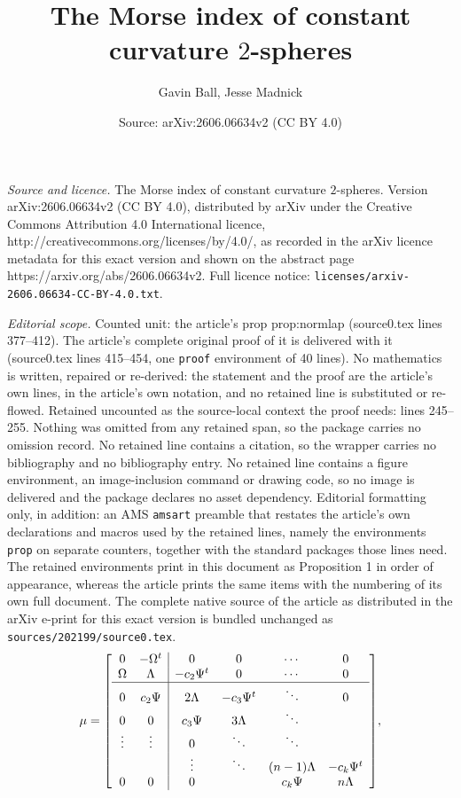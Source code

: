 \documentclass[10pt,a4paper]{amsart}
\title{The Morse index of constant curvature $2$-spheres}
\author{Gavin Ball, Jesse Madnick}
\date{Source: arXiv:2606.06634v2 (CC BY 4.0)}
\begin{document}
\maketitle

\noindent\emph{Source and licence.} The Morse index of constant curvature $2$-spheres. Version arXiv:2606.06634v2 (CC BY 4.0), distributed by arXiv under the Creative Commons Attribution 4.0 International licence, http://creativecommons.org/licenses/by/4.0/, as recorded in the arXiv licence metadata for this exact version and shown on the abstract page https://arxiv.org/abs/2606.06634v2. Full licence notice: \texttt{licenses/arxiv-2606.06634-CC-BY-4.0.txt}.\par\smallskip

\noindent\textit{Editorial scope.} Counted unit: the article's prop prop:normlap (source0.tex lines 377--412). The article's complete original proof of it is delivered with it (source0.tex lines 415--454, one \texttt{proof} environment of 40 lines). No mathematics is written, repaired or re-derived: the statement and the proof are the article's own lines, in the article's own notation, and no retained line is substituted or re-flowed.  Retained uncounted as the source-local context the proof needs: lines 245--255.  Nothing was omitted from any retained span, so the package carries no omission record.  No retained line contains a citation, so the wrapper carries no bibliography and no bibliography entry.  No retained line contains a figure environment, an image-inclusion command or drawing code, so no image is delivered and the package declares no asset dependency.  Editorial formatting only, in addition: an AMS \texttt{amsart} preamble that restates the article's own declarations and macros used by the retained lines, namely the environments \texttt{prop} on separate counters, together with the standard packages those lines need.  The retained environments print in this document as Proposition 1 in order of appearance, whereas the article prints the same items with the numbering of its own full document.  The complete native source of the article as distributed in the arXiv e-print for this exact version is bundled unchanged as \texttt{sources/202199/source0.tex}.
\begin{equation} \label{eq:so3irrmc}
   \mu = \left[ \begin{array}{ c  c | c  c  c  c }
        0 & -\Omega^t & 0 & 0 & \cdots & 0 \\
        \Omega & \Lambda & - c_2 \Psi^t & 0 & \cdots & 0 \\ \hline
        0 & c_2 \Psi & 2 \Lambda & - c_3 \Psi^t & \ddots & 0 \\
        0 & 0 & c_3 \Psi & 3 \Lambda & \ddots & \\
        \vdots & \vdots & 0 & \ddots & \ddots & \\
         & & \vdots & \ddots &(n-1) \Lambda & -c_k \Psi^t \\
         0 & 0 & 0 & & c_k \Psi & n \Lambda
    \end{array}\right]\!,
\end{equation}
\end{document}
